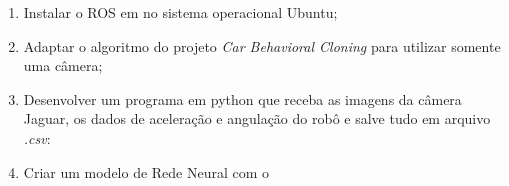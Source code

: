 \begin{enumerate}
\item Instalar o ROS em no sistema operacional Ubuntu;
\item Adaptar o algoritmo do projeto \textit{Car Behavioral Cloning} para utilizar somente uma câmera;
\item Desenvolver um programa em python que receba as imagens da câmera Jaguar, os dados de aceleração e angulação do robô e salve tudo em arquivo \textit{.csv}:
\item Criar um modelo de Rede Neural com o 
\end{enumerate}